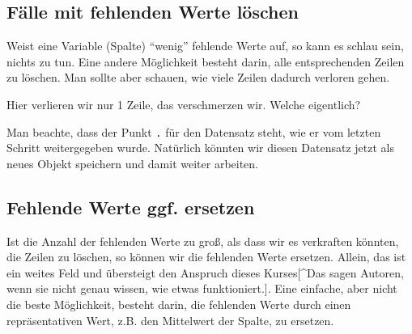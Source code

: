 \documentclass[12pt,]{book}
\makeatletter
\newenvironment{Shaded}{\begin{snugshade}}{\end{snugshade}}
\newcommand{\KeywordTok}[1]{\textcolor[rgb]{0.13,0.29,0.53}{\textbf{{#1}}}}
\newcommand{\StringTok}[1]{\textcolor[rgb]{0.31,0.60,0.02}{{#1}}}
\newcommand{\CommentTok}[1]{\textcolor[rgb]{0.56,0.35,0.01}{\textit{{#1}}}}
\newcommand{\NormalTok}[1]{{#1}}
\newenvironment{kframe}{%
\medskip{}
\setlength{\fboxsep}{.8em}
 \def\at@end@of@kframe{}%
 \ifinner\ifhmode%
  \def\at@end@of@kframe{\end{minipage}}%
  \begin{minipage}{\columnwidth}%
 \fi\fi%
 \def\FrameCommand##1{\hskip\@totalleftmargin \hskip-\fboxsep
 \colorbox{shadecolor}{##1}\hskip-\fboxsep
     \hskip-\linewidth \hskip-\@totalleftmargin \hskip\columnwidth}%
 \MakeFramed {\advance\hsize-\width
   \@totalleftmargin\z@ \linewidth\hsize
   \@setminipage}}%
 {\par\unskip\endMakeFramed%
 \at@end@of@kframe}
\renewenvironment{Shaded}{\begin{kframe}}{\end{kframe}}
\makeatother
\begin{document}
\subsection{Fälle mit fehlenden Werte
löschen}\label{falle-mit-fehlenden-werte-loschen}

Weist eine Variable (Spalte) ``wenig'' fehlende Werte auf, so kann es
schlau sein, nichts zu tun. Eine andere Möglichkeit besteht darin, alle
entsprechenden Zeilen zu löschen. Man sollte aber schauen, wie viele
Zeilen dadurch verloren gehen.

\begin{Shaded}
\end{Shaded}

Hier verlieren wir nur 1 Zeile, das verschmerzen wir. Welche eigentlich?

\begin{Shaded}
\end{Shaded}

Man beachte, dass der Punkt \texttt{.} für den Datensatz steht, wie er
vom letzten Schritt weitergegeben wurde. Natürlich könnten wir diesen
Datensatz jetzt als neues Objekt speichern und damit weiter arbeiten.

\subsection{Fehlende Werte ggf.
ersetzen}\label{fehlende-werte-ggf.-ersetzen}

Ist die Anzahl der fehlenden Werte zu groß, als dass wir es verkraften
könnten, die Zeilen zu löschen, so können wir die fehlenden Werte
ersetzen. Allein, das ist ein weites Feld und übersteigt den Anspruch
dieses Kurses{[}\^{}Das sagen Autoren, wenn sie nicht genau wissen, wie
etwas funktioniert.{]}. Eine einfache, aber nicht die beste Möglichkeit,
besteht darin, die fehlenden Werte durch einen repräsentativen Wert,
z.B. den Mittelwert der Spalte, zu ersetzen.
\end{document}
